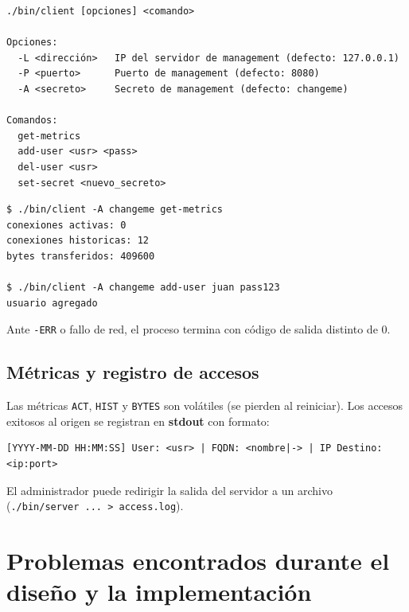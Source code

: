 \documentclass[12pt,a4paper]{article}
\begin{document}
\begin{lstlisting}[caption=Uso del cliente de monitoreo]
./bin/client [opciones] <comando>

Opciones:
  -L <dirección>   IP del servidor de management (defecto: 127.0.0.1)
  -P <puerto>      Puerto de management (defecto: 8080)
  -A <secreto>     Secreto de management (defecto: changeme)

Comandos:
  get-metrics
  add-user <usr> <pass>
  del-user <usr>
  set-secret <nuevo_secreto>
\end{lstlisting}

\begin{lstlisting}[caption=Ejemplos del cliente]
$ ./bin/client -A changeme get-metrics
conexiones activas: 0
conexiones historicas: 12
bytes transferidos: 409600

$ ./bin/client -A changeme add-user juan pass123
usuario agregado
\end{lstlisting}

Ante \texttt{-ERR} o fallo de red, el proceso termina con código de salida distinto de 0.

\subsection{Métricas y registro de accesos}

Las métricas \texttt{ACT}, \texttt{HIST} y \texttt{BYTES} son volátiles (se pierden
al reiniciar). Los accesos exitosos al origen se registran en \textbf{stdout} con
formato:

\begin{verbatim}
[YYYY-MM-DD HH:MM:SS] User: <usr> | FQDN: <nombre|-> | IP Destino: <ip:port>
\end{verbatim}

El administrador puede redirigir la salida del servidor a un archivo
(\texttt{./bin/server ... > access.log}).

\section{Problemas encontrados durante el diseño y la implementación}
\end{document}
